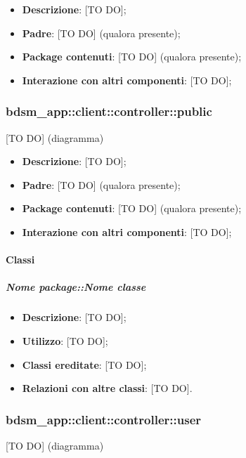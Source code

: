 	\begin{itemize}
		\item \textbf{Descrizione}: [TO DO];
		\item \textbf{Padre}: [TO DO] (qualora presente);
		\item \textbf{Package contenuti}: [TO DO] (qualora presente);
		\item \textbf{Interazione con altri componenti}: [TO DO];
	\end{itemize}


	\subsubsection{bdsm\_app::client::controller::public} %
	\label{ssub:bdsm_app_client_controller_public}
	[TO DO] (diagramma) \newline \newline

	\begin{itemize}
		\item \textbf{Descrizione}: [TO DO];
		\item \textbf{Padre}: [TO DO] (qualora presente);
		\item \textbf{Package contenuti}: [TO DO] (qualora presente);
		\item \textbf{Interazione con altri componenti}: [TO DO];
	\end{itemize}

		\paragraph{Classi} %
			\subparagraph{Nome package::Nome classe} %
			\label{subp:subparagraph_name}
				\begin{itemize}
					\item \textbf{Descrizione}: [TO DO];
					\item \textbf{Utilizzo}: [TO DO];
					\item \textbf{Classi ereditate}: [TO DO];
					\item \textbf{Relazioni con altre classi}: [TO DO].
				\end{itemize}



	\subsubsection{bdsm\_app::client::controller::user} %
	\label{ssub:bdsm_app_client_controller_user}
	[TO DO] (diagramma) \newline \newline

